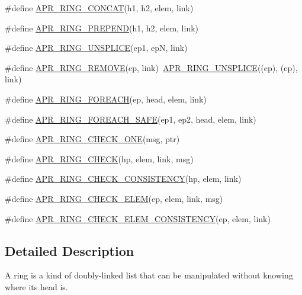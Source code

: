 \begin{DoxyCompactItemize}
\#define \hyperlink{group__apr__ring_ga34ee7a0d6daa61117006bb74498ff5aa}{A\-P\-R\-\_\-\-R\-I\-N\-G\-\_\-\-C\-O\-N\-C\-A\-T}(h1, h2, elem, link)
\item 
\#define \hyperlink{group__apr__ring_ga4d5aaa9b6f02f96f98f234a0a428474d}{A\-P\-R\-\_\-\-R\-I\-N\-G\-\_\-\-P\-R\-E\-P\-E\-N\-D}(h1, h2, elem, link)
\item 
\#define \hyperlink{group__apr__ring_ga1d725b0a9ea7ff88f771e37ec130c13b}{A\-P\-R\-\_\-\-R\-I\-N\-G\-\_\-\-U\-N\-S\-P\-L\-I\-C\-E}(ep1, ep\-N, link)
\item 
\#define \hyperlink{group__apr__ring_gaab4a57544bdb660ec1e306137387d9d7}{A\-P\-R\-\_\-\-R\-I\-N\-G\-\_\-\-R\-E\-M\-O\-V\-E}(ep, link)~\hyperlink{group__apr__ring_ga1d725b0a9ea7ff88f771e37ec130c13b}{A\-P\-R\-\_\-\-R\-I\-N\-G\-\_\-\-U\-N\-S\-P\-L\-I\-C\-E}((ep), (ep), link)
\item 
\#define \hyperlink{group__apr__ring_ga7dc7b26e72f836d27e8e0c87da14fb4a}{A\-P\-R\-\_\-\-R\-I\-N\-G\-\_\-\-F\-O\-R\-E\-A\-C\-H}(ep, head, elem, link)
\item 
\#define \hyperlink{group__apr__ring_ga9a1e91eef86d676d1622dc5b9ddd6f89}{A\-P\-R\-\_\-\-R\-I\-N\-G\-\_\-\-F\-O\-R\-E\-A\-C\-H\-\_\-\-S\-A\-F\-E}(ep1, ep2, head, elem, link)
\item 
\#define \hyperlink{group__apr__ring_ga33c7cfbea7c688c7bd0a3d36609f318b}{A\-P\-R\-\_\-\-R\-I\-N\-G\-\_\-\-C\-H\-E\-C\-K\-\_\-\-O\-N\-E}(msg, ptr)
\item 
\#define \hyperlink{group__apr__ring_ga97bb4dcc313145496e6b05855f9c6e2b}{A\-P\-R\-\_\-\-R\-I\-N\-G\-\_\-\-C\-H\-E\-C\-K}(hp, elem, link, msg)
\item 
\#define \hyperlink{group__apr__ring_ga6b0f2091527ee9c7a1511cb6f172a0a7}{A\-P\-R\-\_\-\-R\-I\-N\-G\-\_\-\-C\-H\-E\-C\-K\-\_\-\-C\-O\-N\-S\-I\-S\-T\-E\-N\-C\-Y}(hp, elem, link)
\item 
\#define \hyperlink{group__apr__ring_ga5500df0e96dea1a3258f1e92b28fea0a}{A\-P\-R\-\_\-\-R\-I\-N\-G\-\_\-\-C\-H\-E\-C\-K\-\_\-\-E\-L\-E\-M}(ep, elem, link, msg)
\item 
\#define \hyperlink{group__apr__ring_gab7070ae5cf69bf16178a0e0e397c5b38}{A\-P\-R\-\_\-\-R\-I\-N\-G\-\_\-\-C\-H\-E\-C\-K\-\_\-\-E\-L\-E\-M\-\_\-\-C\-O\-N\-S\-I\-S\-T\-E\-N\-C\-Y}(ep, elem, link)
\end{DoxyCompactItemize}


\subsection{Detailed Description}
A ring is a kind of doubly-\/linked list that can be manipulated without knowing where its head is. 

